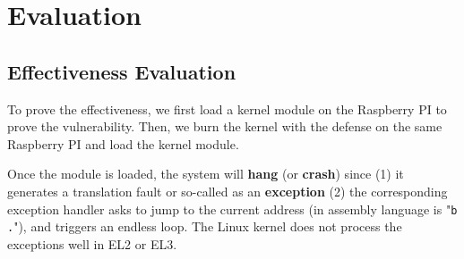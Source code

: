 \section{Evaluation}
\label{sec:evaluation}

\subsection{Effectiveness Evaluation}

To prove the effectiveness, we first load a \TheName{} kernel module on the Raspberry PI to prove the vulnerability.
Then, we burn the kernel with the defense on the same Raspberry PI and load the \TheName{} kernel module.

Once the module is loaded, the system will \textbf{hang} (or 
\textbf{crash}) since (1) it generates a translation fault or 
so-called as an \textbf{exception} 
(2) the corresponding exception handler asks to jump to the current address (in assembly language is "\texttt{b .}"), and triggers an endless loop.
The Linux kernel does not process the exceptions well in EL2 or EL3.


